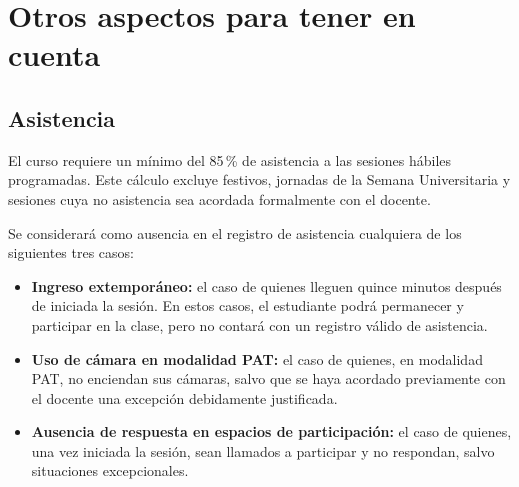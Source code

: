 

%

\section{Otros aspectos para tener en cuenta}



\subsection{Asistencia}

El curso requiere un mínimo del 85\,\% de asistencia a las sesiones
hábiles programadas. Este cálculo excluye festivos, jornadas de la
Semana Universitaria y sesiones cuya no asistencia sea acordada
formalmente con el docente.

Se considerará como ausencia en el registro de asistencia cualquiera de los siguientes tres casos:

\begin{itemize}[leftmargin=*,itemsep=3pt,topsep=4pt]
    \item \textbf{Ingreso extemporáneo:} el caso de quienes lleguen quince minutos después de iniciada la sesión. En estos casos, el estudiante podrá permanecer y participar en la clase, pero no contará con un registro válido de asistencia.
    \item \textbf{Uso de cámara en modalidad PAT:} el caso de quienes, en modalidad PAT, no enciendan sus cámaras, salvo que se haya acordado previamente con el docente una excepción debidamente justificada.    
    \item \textbf{Ausencia de respuesta en espacios de participación:} el caso de quienes, una vez iniciada la sesión, sean llamados a participar y no respondan, salvo situaciones excepcionales.
\end{itemize}


